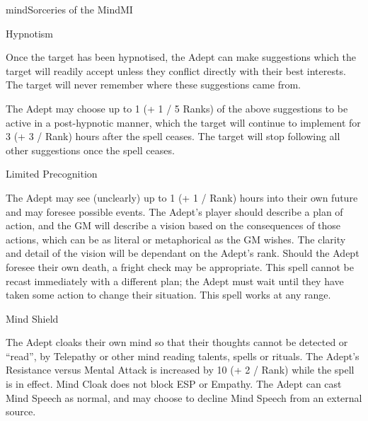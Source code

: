 \begin{college}[1.6]{mind}{Sorceries of the Mind}{MI}
\begin{spell}[G-5]{Hypnotism}
\begin{effects}
Once the target has been hypnotised, the Adept can make suggestions
which the target will readily accept unless they conflict directly
with their best interests. The target will never remember where these
suggestions came from.

The Adept may choose up to 1 (+ 1 / 5 Ranks) of the above suggestions
to be active in a post-hypnotic manner, which the target will continue
to implement for 3 (+ 3 / Rank) hours after the spell ceases. The
target will stop following all other suggestions once the spell
ceases.
\end{effects}
\end{spell}

\begin{spell}[G-6]{Limited Precognition}

\begin{effects}
The Adept may see (unclearly) up to 1 (+ 1 / Rank) hours into their
own future and may foresee possible events.  The Adept's player should
describe a plan of action, and the GM will describe a vision based on
the consequences of those actions, which can be as literal or
metaphorical as the GM wishes. The clarity and detail of the vision
will be dependant on the Adept's rank. Should the Adept foresee their
own death, a fright check may be appropriate. This spell cannot be
recast immediately with a different plan; the Adept must wait until
they have taken some action to change their situation. This spell
works at any range.
\end{effects}
\end{spell}

\begin{spell}[G-7]{Mind Shield}

\begin{effects}
The Adept cloaks their own mind so that their thoughts cannot be
detected or ``read'', \eg by Telepathy or other mind reading talents,
spells or rituals. The Adept's Resistance versus Mental Attack is
increased by 10 (+ 2 / Rank) while the spell is in effect. Mind Cloak
does not block ESP or Empathy. The Adept can cast Mind Speech as
normal, and may choose to decline Mind Speech from an external source.
\end{effects}
\end{spell}


\end{college}
